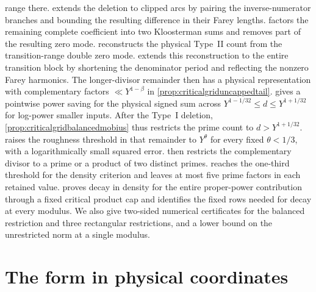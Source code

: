 \documentclass[11pt,a4paper]{article}
\numberwithin{equation}{section}
\begin{document}
range there.
 extends the deletion to
clipped arcs by pairing the inverse-numerator branches and
bounding the resulting difference in their Farey lengths.
 factors the remaining
complete coefficient into two Kloosterman sums and removes
part of the resulting zero mode.
 reconstructs the physical
Type~II count from the transition-range double zero mode.
 extends this
reconstruction to the entire transition block by shortening
the denominator period and reflecting the nonzero Farey
harmonics. The longer-divisor remainder then has a physical
representation with complementary factors $\ll Y^{1-\beta}$
in \cref{prop:criticalgriduncappedtail}.
 gives a pointwise power
saving for the physical signed sum across
$Y^{1-1/32}\le d\le Y^{1+1/32}$ for log-power
smaller inputs. After the Type~I deletion,
\cref{prop:criticalgridbalancedmobius} thus restricts
the prime count to $d>Y^{1+1/32}$.
 raises the roughness
threshold in that remainder to $Y^\theta$ for every
fixed $\theta<1/3$, with a logarithmically small
squared error. 
then restricts the complementary divisor to a prime
or a product of two distinct primes.
 reaches the
one-third threshold for the density criterion and
leaves at most five prime factors in each retained value.
 proves decay in density for the
entire proper-power contribution through a fixed critical
product cap and identifies the fixed rows needed for decay
at every modulus.
We also give two-sided numerical certificates for the balanced restriction
and three rectangular restrictions, and a lower bound on the unrestricted
norm at a single modulus.

\section{The form in physical coordinates}
\label{sec:form}
\end{document}
